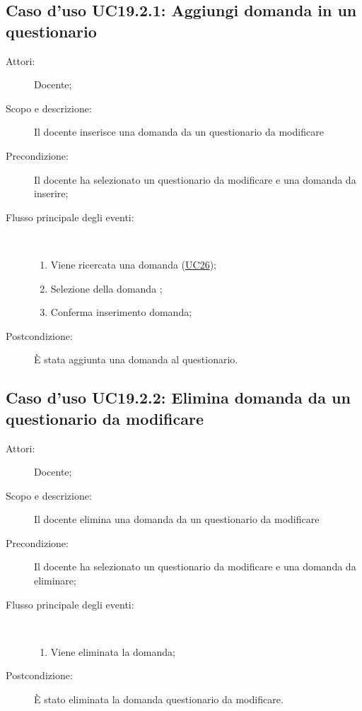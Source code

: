 \subsection{Caso d'uso UC19.2.1: Aggiungi domanda in un questionario}\begin{description}
	\item[Attori:] Docente;
	\item[Scopo e descrizione:] Il docente inserisce una domanda da un questionario da modificare
	\item[Precondizione:] Il docente ha selezionato un questionario da modificare e una domanda da inserire;
	
	\item[Flusso principale degli eventi:] \ 
	\begin{enumerate}
		\item Viene ricercata una domanda (\hyperlink{UC26}{UC26});
		\item Selezione della domanda	;
		\item Conferma inserimento domanda;
		
	\end{enumerate}
	\item[Postcondizione:] È stata aggiunta una domanda al questionario.
\end{description}
\hypertarget{UC19.2.2}{}
\subsection{Caso d'uso UC19.2.2: Elimina domanda da un questionario da  modificare}\begin{description}
	\item[Attori:] Docente;
	\item[Scopo e descrizione:] Il docente elimina una domanda da un questionario da modificare
	\item[Precondizione:] Il docente ha selezionato un questionario da modificare e una domanda da eliminare;
	
	\item[Flusso principale degli eventi:] \ 
	\begin{enumerate}
		\item Viene eliminata la domanda;
		
	\end{enumerate}
	\item[Postcondizione:] È stato eliminata la domanda questionario da modificare.
\end{description}
\hypertarget{UC19.2.3}{}
